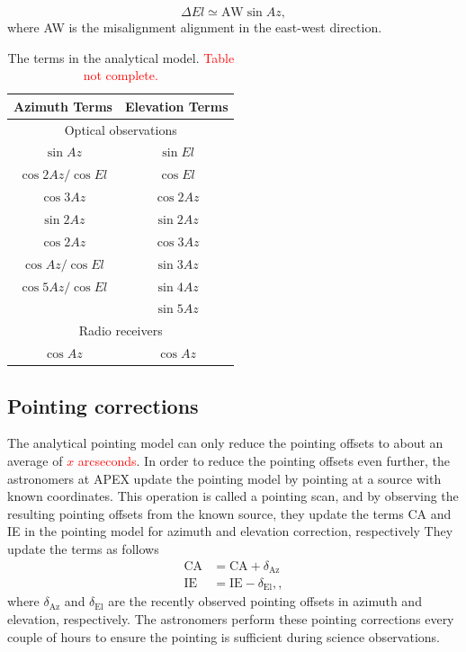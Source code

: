 \begin{equation}
    \Delta El \simeq \text{AW} \sin{Az},
\end{equation}
where AW is the misalignment alignment in the east-west direction.

\begin{table}[h]
    \centering
    \caption{The terms in the analytical model. \textcolor{red}{Table not complete.} }
    \begin{tabular}{cc}
    \textbf{Azimuth Terms} & \textbf{Elevation Terms} \\
    \hline
    \multicolumn{2}{c}{Optical observations} \\ 
    \cline{1-2}
    \hline
    $\sin{Az}$ & $\sin{El}$ \\
    $\cos{2Az}/\cos{El}$ & $\cos{El}$ \\
    $\cos{3Az}$ & $\cos{2Az}$ \\
    $\sin{2Az}$ & $\sin{2Az}$ \\
    $\cos{2Az}$     & $\cos{3Az}$ \\
    $\cos{Az}/\cos{El}$ & $\sin{3Az}$ \\
    $\cos{5Az}/\cos{El}$ & $\sin{4Az}$ \\
    & $\sin{5Az}$ \\
    \multicolumn{2}{c}{Radio receivers} \\
    \cline{1-2}
    \hline
    $\cos{Az}$ & $\cos{Az}$ \\
    \end{tabular}
\end{table}

\subsection{Pointing corrections} 
The analytical pointing model can only reduce the pointing offsets to about an average of \textcolor{red}{$x$ arcseconds}.
In order to reduce the pointing offsets even further, the astronomers at APEX update the pointing model by pointing at a source with known coordinates.
This operation is called a pointing scan, and by observing the resulting pointing offsets from the known source,
they update the terms CA and IE in the pointing model for azimuth and elevation correction, respectively
They update the terms as follows
\begin{align}
    \text{CA} &= \text{CA} + \delta_{\text{Az}} \label{eq:ca}\\ 
    \text{IE} &= \text{IE} - \delta_{\text{El}},\label{eq:ie},
\end{align}
where $\delta_{\text{Az}}$ and $\delta_{\text{El}}$ are the recently observed pointing offsets in azimuth and elevation, respectively.
The astronomers perform these pointing corrections every couple of hours to ensure the pointing is sufficient during science observations.

